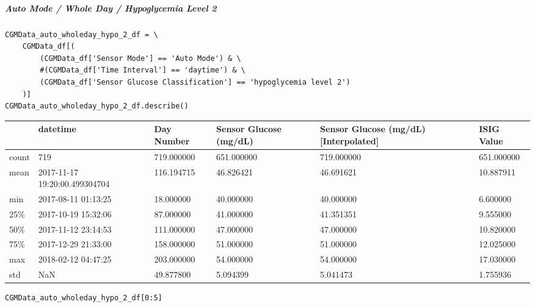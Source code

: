 \subparagraph{Auto Mode / Whole Day / Hypoglycemia Level 2}

\begin{verbatim}
CGMData_auto_wholeday_hypo_2_df = \
    CGMData_df[(
        (CGMData_df['Sensor Mode'] == 'Auto Mode') & \
        #(CGMData_df['Time Interval'] == 'daytime') & \
        (CGMData_df['Sensor Glucose Classification'] == 'hypoglycemia level 2')
    )]
CGMData_auto_wholeday_hypo_2_df.describe()
\end{verbatim}

\bigskip\noindent
\begin{tabular}{p{}p{}p{}p{}p{}p{}}
\toprule
 & datetime & Day Number & Sensor Glucose (mg/dL) & Sensor Glucose (mg/dL) [Interpolated] & ISIG Value \\
\hline
count & 719 & 719.000000 & 651.000000 & 719.000000 & 651.000000 \\
\hline
mean & 2017-11-17 19:20:00.499304704 & 116.194715 & 46.826421 & 46.691621 & 10.887911 \\
\hline
min & 2017-08-11 01:13:25 & 18.000000 & 40.000000 & 40.000000 & 6.600000 \\
\hline
25\% & 2017-10-19 15:32:06 & 87.000000 & 41.000000 & 41.351351 & 9.555000 \\
\hline
50\% & 2017-11-12 23:14:53 & 111.000000 & 47.000000 & 47.000000 & 10.820000 \\
\hline
75\% & 2017-12-29 21:33:00 & 158.000000 & 51.000000 & 51.000000 & 12.025000 \\
\hline
max & 2018-02-12 04:47:25 & 203.000000 & 54.000000 & 54.000000 & 17.030000 \\
\hline
std & NaN & 49.877800 & 5.094399 & 5.041473 & 1.755936 \\
\hline
\bottomrule
\end{tabular}

\bigskip

\begin{verbatim}
CGMData_auto_wholeday_hypo_2_df[0:5]
\end{verbatim}

